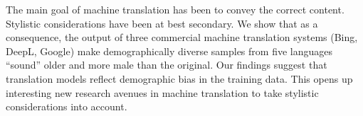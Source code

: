 The main goal of machine translation has been to convey the correct content. Stylistic considerations have been at best secondary. We show that as a consequence, the output of three commercial machine translation systems (Bing, DeepL, Google) make demographically diverse samples from five languages ``sound'' older and more male than the original. Our findings suggest that translation models reflect demographic bias in the training data. This opens up interesting new research avenues in machine translation to take stylistic considerations into account.
